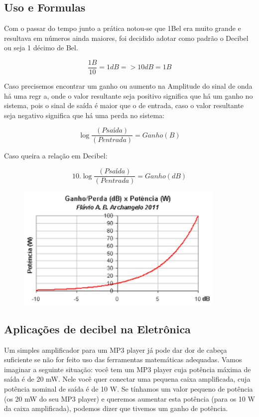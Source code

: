 \documentclass{article}
\begin{document}
\subsection{Uso e Formulas}

Com o passar do tempo junto a prática notou-se que 1Bel era muito grande e resultava em números ainda maiores, foi decidido adotar como padrão o Decibel ou seja 1 décimo de Bel.

$$\frac{1B}{10} = 1dB => 10dB = 1B$$

Caso precisemos encontrar um ganho ou aumento na Amplitude do sinal de onda há uma regr a, onde o valor resultante seja positivo significa que há um ganho no sistema, pois o sinal de saída é maior que o de entrada, caso o valor resultante seja negativo significa que há uma perda no sistema:

\begin{center}
 $$\log \frac {(Psaída)}{(Pentrada)} = Ganho(B)$$
\end{center}

Caso queira a relação em Decibel:

\begin{center}
 $$10 . \log \frac {(Psaída)}{(Pentrada)} = Ganho(dB)$$
\end{center}

\begin{figure}[h!]
\centering
\includegraphics[width=10cm] {grafico.png}
\label{fig:grafico}
\end{figure}


\subsection{Aplicações de decibel na Eletrônica}

Um simples amplificador para um MP3 player já pode dar dor de cabeça suficiente se não for feito uso das ferramentas matemáticas adequadas. Vamos imaginar a seguinte situação: você tem um MP3 player cuja potência máxima de saída é de 20 mW. Nele você quer conectar uma pequena caixa amplificada, cuja potência nominal de saída é de 10 W. Se tínhamos um valor pequeno de potência (os 20 mW do seu MP3 player) e queremos aumentar esta potência (para os 10 W da caixa amplificada), podemos dizer que tivemos um ganho de potência.
\end{document}
